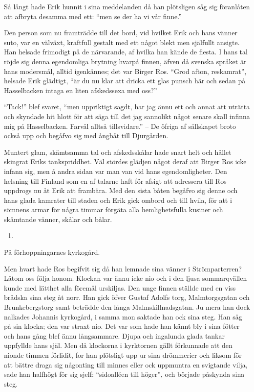 Så långt hade Erik hunnit i sina meddelanden då han plötsligen såg sig
föranlåten att afbryta desamma med ett: ``men se der ha vi vår finne.''

Den person som nu framträdde till det bord, vid hvilket Erik och hans
vänner suto, var en välväxt, kraftfull gestalt med ett något blekt men
själfullt ansigte. Han helsade frimodigt på de närvarande, af hvilka han
kände de flesta. I hans tal röjde sig denna egendomliga brytning hvarpå
finnen, äfven då svenska språket är hans modersmål, alltid igenkännes;
det var Birger Ros. ``Grod afton, reskamrat'', helsade Erik glädtigt,
``är du nu klar att dricka ett glas punsch här och sedan på Hasselbacken
intaga en liten afskedssexa med oss?''

``Tack!'' blef svaret, ``men uppriktigt sagdt, har jag ännu ett och
annat att uträtta och skyndade hit hlott för att säga till det jag
sannolikt något senare skall infinna mig på Hasselbacken. Farväl alltså
tillsvidare.'' -- De öfriga af sällskapet broto också upp och begåfvo
sig med ångbåt till Djurgården.

Muntert glam, skämtsamma tal och afskedsskålar hade snart helt och
hållet skingrat Eriks tankspriddhet. Väl stördes glädjen något deraf att
Birger Ros icke infann sig, men å andra sidan var man van vid hans
egendomligheter. Den helsning till Finland som en af talarne haft för
afsigt att adressera till Ros uppdrogs nu åt Erik att frambära. Med den
sista båten begåfvo sig denne och hans glada kamrater till staden och
Erik gick ombord och till hvila, för att i sömnens armar för några
timmar förgäta alla hemlighetsfulla kusiner och skämtande vänner, skålar
och bålar.

\begin{enumerate}
\def\labelenumi{\arabic{enumi}.}
\setcounter{enumi}{2}
\tightlist
\item
\end{enumerate}

På förhoppningarnes kyrkogård.

Men hvart hade Ros begifvit sig då han lemnade sina vänner i
Strömparterren? Låtom oss följa honom. Klockan var ännu icke nio och i
den ljusa sommarqvällen kunde med lätthet alla föremål urskiljas. Den
unge finnen ställde med en viss brådska sina steg åt norr. Han gick
öfver Gustaf Adolfs torg, Malmtorgsgatan och Brunkebergstorg samt
beträdde den långa Malmskillnadsgatan. Ju mera han dock nalkades
Johannis kyrkogård, i samma mon saktade han ock sina steg. Han såg på
sin klocka; den var straxt nio. Det var som hade han kännt bly i sina
fötter och hans gång blef ännu långsammare. Djupa och ingalunda glada
tankar uppfyllde hans själ. Men då klockorna i kyrktornen gällt
förkunnade att den nionde timmen förlidit, for han plötsligt upp ur sina
drömmerier och liksom för att bättre draga sig någonting till minnes
eller ock uppmuntra en svigtande vilja, sade han halfhögt för sig sjelf:
``sidoalléen till höger'', och började påskynda sina steg.

